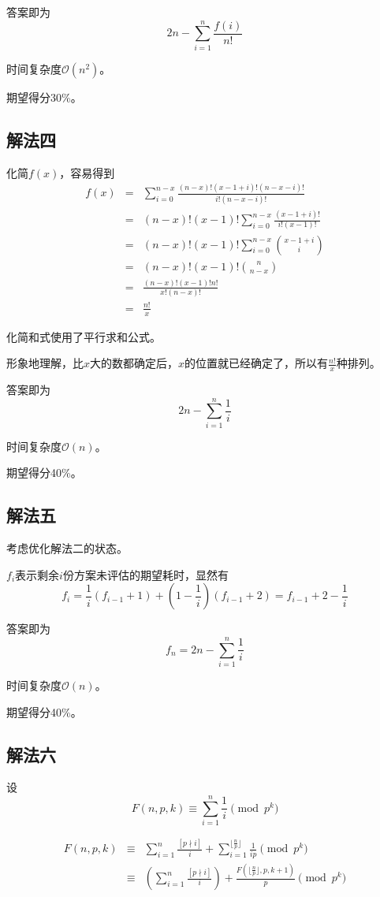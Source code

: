\documentclass{article}
\begin{document}
答案即为
\[
2n - \sum_{i=1}^n \frac{f(i)}{n!}
\]

时间复杂度$\mathcal{O}(n^2)$。

期望得分30\%。

\subsection*{解法四}

化简$f(x)$，容易得到
\begin{eqnarray*}
f(x)
& = & \sum_{i=0}^{n-x} \frac{(n-x)! (x-1+i)! (n-x-i)!}{i! (n-x-i)!}  \\
& = & (n-x)! (x-1)! \sum_{i=0}^{n-x} \frac{(x-1+i)!}{i!(x-1)!} \\
& = & (n-x)! (x-1)! \sum_{i=0}^{n-x} \binom{x-1+i}{i} \\
& = & (n-x)! (x-1)! \binom{n}{n-x} \\
& = & \frac{(n-x)! (x-1)! n!}{x! (n-x)!} \\
& = & \frac{n!}{x}
\end{eqnarray*}

化简和式使用了平行求和公式。

形象地理解，比$x$大的数都确定后，$x$的位置就已经确定了，所以有$\frac{n!}{x}$种排列。

答案即为
\[
2n-\sum_{i=1}^n \frac{1}{i}
\]

时间复杂度$\mathcal{O}(n)$。

期望得分40\%。

\subsection*{解法五}

考虑优化解法二的状态。

$f_i$表示剩余$i$份方案未评估的期望耗时，显然有
\[
f_i
= \frac{1}{i}(f_{i-1}+1)+(1-\frac{1}{i})(f_{i-1}+2)
= f_{i-1}+2-\frac{1}{i}
\]

答案即为
\[
f_n=2n-\sum_{i=1}^n \frac{1}{i}
\]

时间复杂度$\mathcal{O}(n)$。

期望得分40\%。

\subsection*{解法六}
 
设\[F(n,p,k) \equiv \sum_{i=1}^n \frac{1}{i} \pmod{p^k}\]

\begin{eqnarray*}
F(n,p,k)
& \equiv & \sum_{i=1}^n \frac{[p \nmid i]}{i} + \sum_{i=1}^{\lfloor \frac{n}{p} \rfloor} \frac{1}{ip} \pmod{p^k}\\
& \equiv & \left( \sum_{i=1}^n \frac{[p \nmid i]}{i} \right) + \frac{F(\lfloor \frac{n}{p} \rfloor ,p,k+1)}{p} \pmod{p^k}
\end{eqnarray*}
\end{document}
